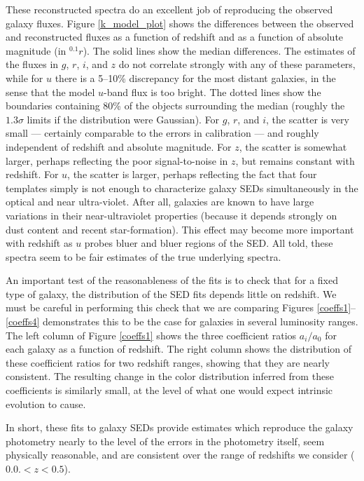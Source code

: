 \documentclass[10pt,preprint]{aastex}
\newcommand{\band}[2]{\ensuremath{^{#1}{#2}}}
\begin{document}
These reconstructed spectra do an excellent job of reproducing the
observed galaxy fluxes. Figure \ref{k_model_plot} shows the
differences between the observed and reconstructed fluxes as a
function of redshift and as a function of absolute magnitude (in
$\band{0.1}{r}$).  The solid lines show the median differences. The
estimates of the fluxes in $g$, $r$, $i$, and $z$ do not correlate
strongly with any of these parameters, while for $u$ there is a
5--10\% discrepancy for the most distant galaxies, in the sense that
the model $u$-band flux is too bright. The dotted lines show the
boundaries containing 80\% of the objects surrounding the median
(roughly the $1.3\sigma$ limits if the distribution were
Gaussian). For $g$, $r$, and $i$, the scatter is very small ---
certainly comparable to the errors in calibration --- and roughly
independent of redshift and absolute magnitude. For $z$, the scatter
is somewhat larger, perhaps reflecting the poor signal-to-noise in
$z$, but remains constant with redshift. For $u$, the scatter is
larger, perhaps reflecting the fact that four templates simply is not
enough to characterize galaxy SEDs simultaneously in the optical and
near ultra-violet. After all, galaxies are known to have large
variations in their near-ultraviolet properties (because it depends
strongly on dust content and recent star-formation). This effect may
become more important with redshift as $u$ probes bluer and bluer
regions of the SED. All told, these spectra seem to be fair estimates
of the true underlying spectra.

An important test of the reasonableness of the fits is to check that
for a fixed type of galaxy, the distribution of the SED fits
depends little on redshift. We must be careful in performing this
check that we are comparing Figures \ref{coeffs1}--\ref{coeffs4}
demonstrates this to be the case for galaxies in several luminosity
ranges. The left column of Figure \ref{coeffs1} shows the three
coefficient ratios $a_i/a_0$ for each galaxy as a function of
redshift. The right column shows the distribution of these coefficient
ratios for two redshift ranges, showing that they are nearly
consistent. The resulting change in the color distribution inferred
from these coefficients is similarly small, at the level of what one
would expect intrinsic evolution to cause.

In short, these fits to galaxy SEDs provide estimates which reproduce
the galaxy photometry nearly to the level of the errors in the
photometry itself, seem physically reasonable, and are consistent over
the range of redshifts we consider ($0.0. < z < 0.5$).
\end{document}

